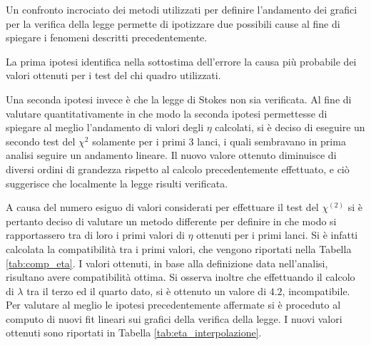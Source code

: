 \documentclass[a4paper,11pt,oneside]{article}
\begin{document}
Un confronto incrociato dei metodi utilizzati per definire l'andamento dei grafici per la verifica della legge permette di ipotizzare due possibili cause al fine di spiegare i fenomeni descritti precedentemente.

La prima ipotesi identifica nella sottostima dell'errore la causa più probabile dei valori ottenuti per i test del chi quadro utilizzati.


Una seconda ipotesi invece è che la legge di Stokes non sia verificata. Al fine di valutare quantitativamente in che modo la seconda ipotesi permettesse di spiegare al meglio l'andamento di valori degli $\eta$ calcolati, si è deciso di eseguire un secondo test del $\chi^2$ solamente per i primi 3 lanci, i quali sembravano in prima analisi seguire un andamento lineare. Il nuovo valore ottenuto diminuisce di diversi ordini di grandezza rispetto al calcolo precedentemente effettuato, e ciò suggerisce che localmente la legge risulti verificata.\newline

A causa del numero esiguo di valori considerati per effettuare il test del $\chi^{(2)}$ si è pertanto deciso di valutare un metodo differente per definire in che modo si rapportassero tra di loro i primi valori di $\eta$ ottenuti per i primi lanci. Si è infatti calcolata la compatibilità tra i primi valori, che vengono riportati nella Tabella \ref{tab:comp_eta}.
I valori ottenuti, in base alla definizione data nell'analisi, risultano avere compatibilità ottima.
Si osserva inoltre che effettuando il calcolo di $\lambda$ tra il terzo ed il quarto dato, si è ottenuto un valore di $4.2$, incompatibile.\newline
Per valutare al meglio le ipotesi precedentemente affermate si è proceduto al computo di nuovi fit lineari sui grafici della verifica della legge. I nuovi valori ottenuti sono riportati in  Tabella \ref{tab:eta_interpolazione}.
\end{document}
